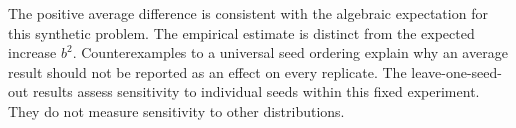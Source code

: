 The positive average difference is consistent with the algebraic expectation
for this synthetic problem. The empirical estimate is distinct from the
expected increase $b^2$. Counterexamples to a universal seed ordering explain
why an average result should not be reported as an effect on every replicate.
The leave-one-seed-out results assess sensitivity to individual seeds within
this fixed experiment. They do not measure sensitivity to other distributions.
